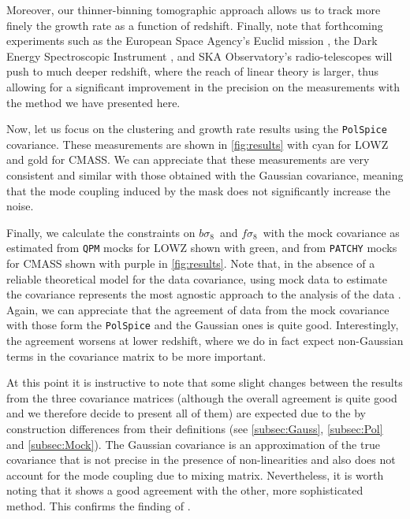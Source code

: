 \documentclass[astrosymb,twocolumn]{aastex631}
\newcommand{\bs}{\ensuremath{b\sigma_8}}
\renewcommand{\fs}{\ensuremath{f\!\sigma_8}}
\begin{document}
Moreover, our thinner-binning tomographic approach allows us to track more finely the growth rate as a function of redshift. Finally, note that forthcoming experiments such as the European Space Agency's Euclid mission \citep{Laureijs2011,Amendola2013,Amendola2016}, the Dark Energy Spectroscopic Instrument \citep{DESIcollab2016}, and SKA Observatory's radio-telescopes \citep{Maartens2015,Abdalla2015,SKA1_2018} will push to much deeper redshift, where the reach of linear theory is larger, thus allowing for a significant improvement in the precision on the measurements with the method we have presented here.

Now, let us focus on the clustering and growth rate results using the \texttt{PolSpice} covariance. These measurements are shown in \autoref{fig:results} with cyan for LOWZ and gold for CMASS. We can appreciate that these measurements are very consistent and similar with those obtained with the Gaussian covariance, meaning that the mode coupling induced by the mask does not significantly increase the noise.

Finally, we calculate the constraints on \bs\ and \fs\ with the mock covariance as estimated from \texttt{QPM} mocks for LOWZ shown with green, and from \texttt{PATCHY} mocks for CMASS shown with purple in \autoref{fig:results}. Note that, in the absence of a reliable theoretical model for the data covariance, using mock data to estimate the covariance represents the most agnostic approach to the analysis of the data \citep[see also][]{2022MNRAS.510.3207P}. Again, we can appreciate that the agreement of data from the mock covariance with those form the \texttt{PolSpice} and the Gaussian ones is quite good. Interestingly, the agreement worsens at lower redshift, where we do in fact expect non-Gaussian terms in the covariance matrix to be more important.

At this point it is instructive to note that some slight changes between the results from the three covariance matrices (although the overall agreement is quite good and we therefore decide to present all of them) are expected due to the by construction differences from their definitions (see \autoref{subsec:Gauss}, \autoref{subsec:Pol} and \autoref{subsec:Mock}). The Gaussian covariance is an approximation of the true covariance that is not precise in the presence of non-linearities and also does not account for the mode coupling due to mixing matrix. Nevertheless, it is worth noting that it shows a good agreement with the other, more sophisticated method. This confirms the finding of \citet{Loureiro2019}.
\end{document}
